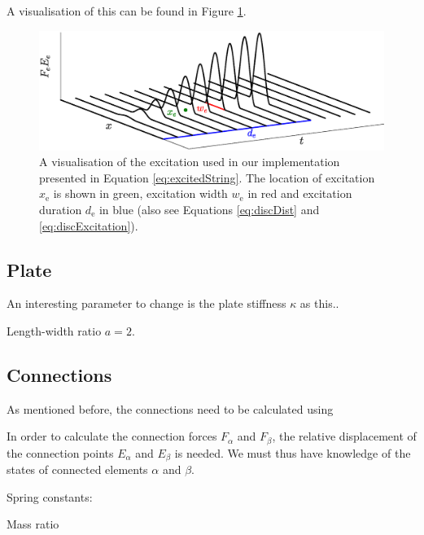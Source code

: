 \documentclass{article}
\begin{document}
A visualisation of this can be found in Figure \ref{fig:exctiation}.

\begin{figure}[h]
\centering
\includegraphics[width=1.0\columnwidth]{excitation.eps}
\caption{A visualisation of the excitation used in our implementation presented in Equation \eqref{eq:excitedString}. The location of excitation $x_\text{e}$ is shown in green, excitation width $w_\text{e}$ in red and excitation duration $d_\text{e}$ in blue (also see Equations \eqref{eq:discDist} and \eqref{eq:discExcitation}). \label{fig:exctiation}}
\end{figure}


\subsection{Plate}
An interesting parameter to change is the plate stiffness $\kappa$ as this..

Length-width ratio $a = 2$. 

\subsection{Connections}
As mentioned before, the connections need to be calculated using 

In order to calculate the connection forces $F_\alpha$ and $F_\beta$, the relative displacement of the connection points $E_\alpha$ and $E_\beta$ is needed. We must thus have knowledge of the states of connected elements $\alpha$ and $\beta$. 

Spring constants:

Mass ratio
\end{document}
